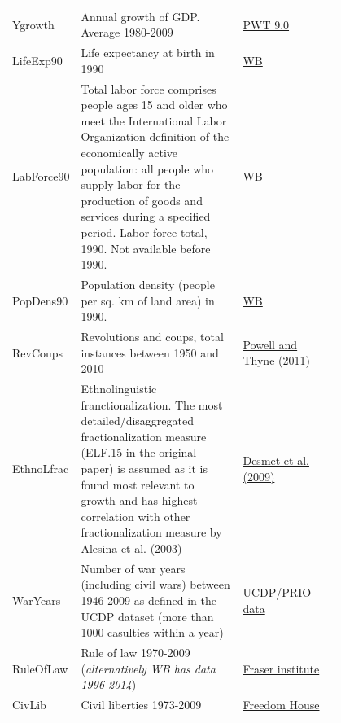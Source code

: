 \documentclass[a4paper,11pt]{article}
\begin{document}
\begin{center}
\begin{longtable}{l p{0.50\linewidth} p{0.3\linewidth}}
  Ygrowth & Annual growth of GDP. Average 1980-2009 & \href{http://www.rug.nl/research/ggdc/data/pwt/pwt-9.0}{PWT 9.0} \\

  LifeExp90 & Life expectancy at birth in 1990 & \href{http://data.worldbank.org/indicator/SP.DYN.LE00.IN}{WB}\\
     
  LabForce90 & Total labor force comprises people ages 15 and older who meet the International Labor Organization definition of the economically active population: all people who supply labor for the production of goods and services during a specified period. Labor force total, 1990. Not available before 1990. & \href{http://data.worldbank.org/indicator/SL.TLF.CACT.ZS}{WB} \\

  PopDens90 & Population density (people per sq. km of land area) in 1990. & \href{http://data.worldbank.org/indicator/EN.POP.DNST}{WB} \\

  RevCoups & Revolutions and coups, total instances between 1950 and 2010 & \href{http://jpr.sagepub.com/content/48/2/249.abstract}{Powell and Thyne (2011)} \\
  
  EthnoLfrac & Ethnolinguistic franctionalization. The most detailed/disaggregated fractionalization measure (ELF.15 in the original paper) is assumed as it is found most relevant to growth and has highest correlation with other fractionalization measure by \href{http://www.nsd.uib.no/macrodataguide/set.html?id=16&sub=1}{Alesina et al. (2003)} & \href{http://www.anderson.ucla.edu/faculty_pages/romain.wacziarg/papersum.html}{Desmet et al. (2009)} \\
  
  WarYears & Number of war years (including civil wars) between 1946-2009 as defined in the UCDP dataset (more than 1000 casulties within a year) & \href{http://www.pcr.uu.se/research/ucdp/datasets/ucdp_prio_armed_conflict_dataset/}{UCDP/PRIO data} \\
  
  RuleOfLaw & Rule of law 1970-2009 (\textit{alternatively WB has data 1996-2014})& \href{http://efwdata.com/grid/WxRvYnU#/Grid}{Fraser institute} \\

  CivLib & Civil liberties 1973-2009 & \href{https://freedomhouse.org/report/freedom-world-2016/methodology}{Freedom House} \\
  

\end{longtable}
\end{center}
\end{document}
